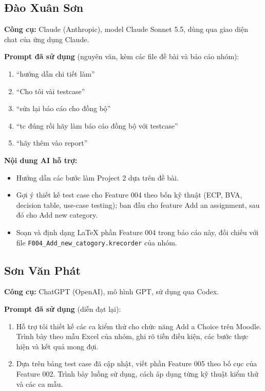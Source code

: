 \documentclass[12pt,a4paper]{article}
\begin{document}
\subsection{Đào Xuân Sơn}
\textbf{Công cụ:} Claude (Anthropic), model Claude Sonnet 5.5, dùng qua giao diện chat của ứng dụng Claude.

\noindent\textbf{Prompt đã sử dụng} (nguyên văn, kèm các file đề bài và báo cáo nhóm):
\begin{enumerate}[noitemsep]
  \item ``hướng dẫn chi tiết làm''
  \item ``Cho tôi vài testcase''
  \item ``sửa lại báo cáo cho đồng bộ''
  \item ``tc đúng rồi hãy làm báo cáo đồng bộ với testcase''
  \item ``hãy thêm vào report''
\end{enumerate}

\noindent\textbf{Nội dung AI hỗ trợ:}
\begin{itemize}[noitemsep]
  \item Hướng dẫn các bước làm Project 2 dựa trên đề bài.
  \item Gợi ý thiết kế test case cho Feature 004 theo bốn kỹ thuật (ECP, BVA, decision table, use-case testing); ban đầu cho feature Add an assignment, sau đó cho Add new category.
  \item Soạn và định dạng LaTeX phần Feature 004 trong báo cáo này, đối chiếu với file \texttt{F004\_Add\_new\_catogory.krecorder} của nhóm.
\end{itemize}

\subsection{Sơn Văn Phát}
\textbf{Công cụ:} ChatGPT (OpenAI), mô hình GPT, sử dụng qua Codex.

\noindent\textbf{Prompt đã sử dụng} (diễn đạt lại):
\begin{enumerate}[noitemsep]
  \item Hỗ trợ tôi thiết kế các ca kiểm thử cho chức năng Add a Choice trên Moodle. Trình bày theo mẫu Excel của nhóm, ghi rõ tiền điều kiện, các bước thực hiện và kết quả mong đợi.
  \item Dựa trên bảng test case đã cập nhật, viết phần Feature 005 theo bố cục của Feature 002. Trình bày luồng sử dụng, cách áp dụng từng kỹ thuật kiểm thử và các ca mẫu.
\end{enumerate}
\end{document}
